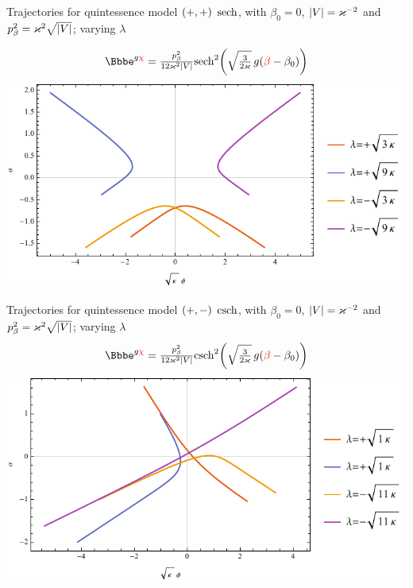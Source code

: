 \documentclass[8pt]{beamer}
\begin{document}
\begin{frame}
\begin{itemize}
\end{itemize}
\end{frame}


\begin{frame}%
{Trajectories for quintessence model ${\left(+,+\right)}$}%
{$\operatorname{sech}$, with $\beta_0 = 0$, ${\left|V\right|} = \varkappa^{-2}$ and
$p_\beta^2 = \varkappa^2\sqrt{{\left|V\right|}}$; varying $\lambda$}

\begin{align}
\ee^{g\textcolor{red}{\chi}} = 
\tfrac{p_\beta^2}{12\varkappa^2\vbr{V}}
\rfun{\sech^2}{ \sqrt{\tfrac{3}{2\varkappa}}\,g 
\rbr{\textcolor{red}{\beta}-\beta_0}}
\end{align}
\includegraphics[width=\textwidth]{../plots.nb/sech_lamb.pdf}

\end{frame}


\begin{frame}%
{Trajectories for quintessence model ${\left(+,-\right)}$}%
{$\operatorname{csch}$, with $\beta_0 = 0$, ${\left|V\right|} = \varkappa^{-2}$ and
$p_\beta^2 = \varkappa^2\sqrt{{\left|V\right|}}$; varying $\lambda$}
\begin{align}
\ee^{g\textcolor{red}{\chi}} = 
\tfrac{p_\beta^2}{12\varkappa^2\vbr{V}}
\rfun{\csch^2}{ \sqrt{\tfrac{3}{2\varkappa}}\,g 
\rbr{\textcolor{red}{\beta}-\beta_0}}
\end{align}
\includegraphics[width=\textwidth]{../plots.nb/csch_lamb_l.pdf}

\end{frame}
\end{document}
